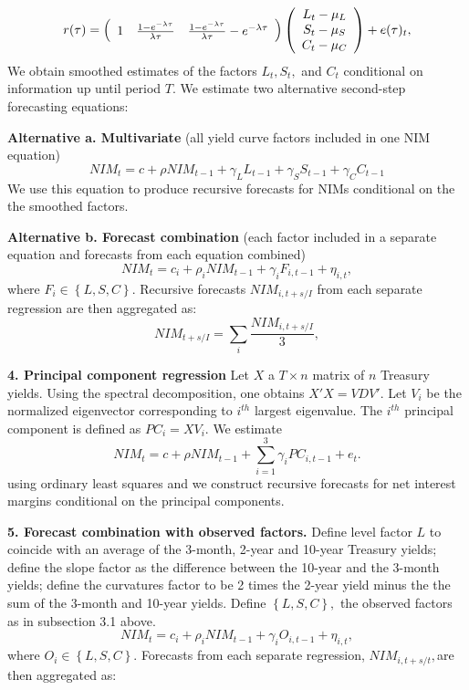 \documentclass[11pt]{article}
\begin{document}
\[
r(\tau )=\left(
\begin{array}{ccc}
1 & \frac{1-e^{-\lambda \tau }}{\lambda \tau } & \frac{1-e^{-\lambda \tau }}{%
\lambda \tau }-e^{-\lambda \tau }%
\end{array}%
\right) \left(
\begin{array}{c}
{L_{t}-\mu _{L}} \\
{S_{t}-\mu _{S}} \\
{C_{t}-\mu _{C}} 
\end{array}%
\right) +e(\tau )_{t},
\]
We obtain smoothed estimates of the factors $L_{t},S_{t},$ and $C_{t}$ conditional on information up until period $T.$ We estimate two alternative second-step forecasting equations:

\noindent \textbf{Alternative a. Multivariate} (all yield curve factors included in one NIM equation)
\[
NIM_{t}=c+\rho NIM_{t-1}+\gamma _{L}L_{t-1}+\gamma _{S}S_{t-1}+\gamma
_{C}C_{t-1}
\]
We use this equation to produce recursive forecasts for NIMs conditional on the the smoothed factors.

\noindent \textbf{Alternative b. Forecast combination} (each factor included in a separate equation and forecasts from each equation combined)
\[
NIM_{t}=c_{i}+\rho _{i}NIM_{t-1}+\gamma _{i}F_{i,t-1}+{\eta _{i,t},}
\]%
where $F_{i}\in \left\{ L,S,C\right\}.$ Recursive forecasts $NIM_{i,t+s/I}$ from each separate regression are then aggregated as:
\[
NIM_{t+s/I}=\sum_{i}\frac{NIM_{i,t+s/I}}{3},
\]

\textbf{4. Principal component regression}
Let $X$ a $T \times n$ matrix of $n$ Treasury yields.  Using the spectral decomposition, one obtains $X'X = VDV'$. Let $V_i$ be the normalized eigenvector corresponding to $i^{th}$ largest eigenvalue.
The $i^{th}$ principal component is defined as $PC_i = XV_i$. We estimate
\begin{equation*}
NIM_t = c + \rho NIM_{t-1} + \sum_{i=1}^3 \gamma_i PC_{i,t-1} + e_t.
\end{equation*}
using ordinary least squares and we construct recursive forecasts for net interest margins conditional on the principal components.

\noindent \textbf{5. Forecast combination with observed factors.} Define level factor $L$ to coincide with an average of the 3-month, 2-year and 10-year Treasury yields; define the slope factor as the difference between the 10-year and the 3-month yields; define the curvatures factor to be 2 times the 2-year yield minus the the sum of the 3-month and 10-year yields. Define $\left\{L,S,C \right\} ,$ the observed factors as in subsection 3.1 above.
\[
NIM_{t}=c_{i}+\rho _{i}NIM_{t-1}+\gamma _{i}O_{i,t-1}+{\eta _{i,t},}
\]%
where $O_{i}\in \left\{ L,S,C\right\} .$ Forecasts  from each separate regression, $NIM_{i,t+s/t},$are then aggregated as:
\end{document}
